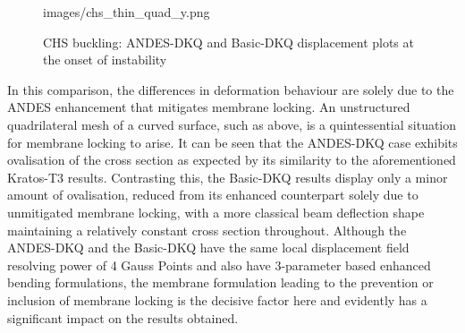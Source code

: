 \begin{figure}[H]
{	{images/chs_thin_quad_y.png}}
	\caption{\label{chs buckling pics2}CHS buckling: ANDES-DKQ and Basic-DKQ displacement plots at the onset of instability}
\end{figure}

In this comparison, the differences in deformation behaviour are solely due to the ANDES enhancement that mitigates membrane locking. An unstructured quadrilateral mesh of a curved surface, such as above, is a quintessential situation for membrane locking to arise. It can be seen that the ANDES-DKQ case exhibits ovalisation of the cross section as expected by its similarity to the aforementioned Kratos-T3 results. Contrasting this, the Basic-DKQ results display only a minor amount of ovalisation, reduced from its enhanced counterpart solely due to unmitigated membrane locking, with a more classical beam deflection shape maintaining a relatively constant cross section throughout. Although the ANDES-DKQ and the Basic-DKQ have the same local displacement field resolving power of 4 Gauss Points and also have 3-parameter based enhanced bending formulations, the membrane formulation leading to the prevention or inclusion of membrane locking is the decisive factor here and evidently has a significant impact on the results obtained.

